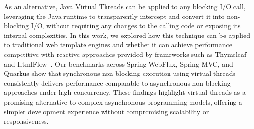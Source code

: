 \documentclass[software,article,accept,pdftex,moreauthors]{Definitions/mdpi}
\begin{document}
As an alternative, Java Virtual Threads can be applied to any blocking I/O call,
leveraging the Java runtime to transparently intercept and convert it into non-blocking I/O,
without requiring any changes to the calling code or exposing its internal complexities.
In this work, we explored how this technique can be applied to traditional
web template engines and whether it can achieve performance competitive with
reactive approaches provided by frameworks such as Thymeleaf~\cite{webflux} and HtmlFlow~\cite{htmlflow}.
Our benchmarks across Spring WebFlux, Spring MVC, and Quarkus show that synchronous
non-blocking execution using virtual threads consistently delivers performance
comparable to asynchronous non-blocking approaches under high concurrency.
These findings highlight virtual threads as a promising alternative to complex
asynchronous programming models, offering a simpler development experience
without compromising scalability or responsiveness.
\end{document}
